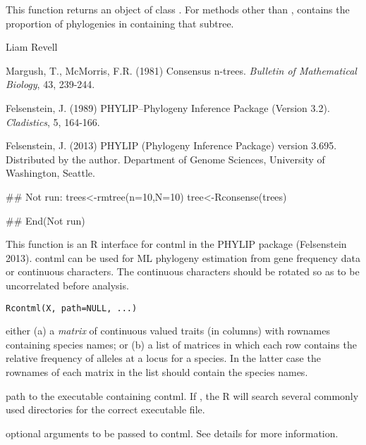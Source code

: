 \documentclass[a4paper]{book}
\begin{document}
%
\begin{Value}
This function returns an object of class . For methods other than ,  contains the proportion of phylogenies in  containing that subtree.
\end{Value}
%
\begin{Author}\relax
Liam Revell 
\end{Author}
%
\begin{References}\relax
Margush, T., McMorris, F.R. (1981) Consensus n-trees. \emph{Bulletin of Mathematical Biology}, 43, 239-244.

Felsenstein, J. (1989) PHYLIP--Phylogeny Inference Package (Version 3.2). \emph{Cladistics}, 5, 164-166.

Felsenstein, J. (2013) PHYLIP (Phylogeny Inference Package) version 3.695. Distributed by the author. Department of Genome Sciences, University of Washington, Seattle.
\end{References}
%
\begin{Examples}
\begin{ExampleCode}
## Not run: 
trees<-rmtree(n=10,N=10)
tree<-Rconsense(trees)

## End(Not run)
\end{ExampleCode}
\end{Examples}
%
\begin{Description}\relax
This function is an R interface for contml in the PHYLIP package (Felsenstein 2013). contml can be used for ML phylogeny estimation from gene frequency data or continuous characters. The continuous characters should be rotated so as to be uncorrelated before analysis.
\end{Description}
%
\begin{Usage}
\begin{verbatim}
Rcontml(X, path=NULL, ...)
\end{verbatim}
\end{Usage}
%
\begin{Arguments}
\begin{ldescription}
\item[\code{X}] either (a) a \emph{matrix} of continuous valued traits (in columns) with rownames containing species names; or (b) a list of matrices in which each row contains the relative frequency of alleles at a locus for a species. In the latter case the rownames of each matrix in the list should contain the species names.
\item[\code{path}] path to the executable containing contml. If , the R will search several commonly used directories for the correct executable file.
\item[\code{...}] optional arguments to be passed to contml. See details for more information.
\end{ldescription}
\end{Arguments}
\end{document}
